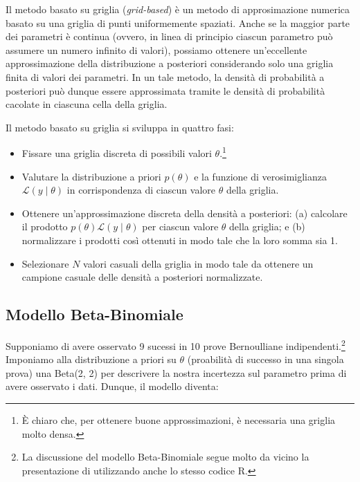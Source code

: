 \documentclass[
]{memoir}
\providecommand{\tightlist}{%
  \setlength{\itemsep}{0pt}\setlength{\parskip}{0pt}}
\newcommand{\R}{\textsf{R}} %
\begin{document}
Il metodo basato su griglia (\emph{grid-based}) è un metodo di approsimazione numerica basato su una griglia di punti uniformemente spaziati. Anche se la maggior parte dei parametri è continua (ovvero, in linea di principio ciascun parametro può assumere un numero infinito di valori), possiamo ottenere un'eccellente approssimazione della distribuzione a posteriori considerando solo una griglia finita di valori dei parametri. In un tale metodo, la densità di probabilità a posteriori può dunque essere approssimata tramite le densità di probabilità cacolate in ciascuna cella della griglia.

Il metodo basato su griglia si sviluppa in quattro fasi:

\begin{itemize}
\tightlist
\item
  Fissare una griglia discreta di possibili valori \(\theta\).\footnote{È chiaro che, per ottenere buone approssimazioni, è necessaria una griglia molto densa.}
\item
  Valutare la distribuzione a priori \(p(\theta)\) e la funzione di verosimiglianza \(\mathcal{L}(y \mid \theta)\) in corrispondenza di ciascun valore \(\theta\) della griglia.
\item
  Ottenere un'approssimazione discreta della densità a posteriori: (a) calcolare il prodotto \(p(\theta) \mathcal{L} (y \mid \theta)\) per ciascun
  valore \(\theta\) della griglia; e (b) normalizzare i prodotti così ottenuti in modo tale che la loro somma sia 1.
\item
  Selezionare \(N\) valori casuali della griglia in modo tale da ottenere un campione casuale delle densità a posteriori normalizzate.
\end{itemize}

\hypertarget{modello-beta-binomiale}{%
\subsection{Modello Beta-Binomiale}\label{modello-beta-binomiale}}

Supponiamo di avere osservato 9 sucessi in 10 prove Bernoulliane indipendenti.\footnote{La discussione del modello Beta-Binomiale segue molto da vicino la presentazione di \citet{Johnson2022bayesrules} utilizzando anche lo stesso codice \R.} Imponiamo alla distribuzione a priori su \(\theta\) (proabilità di successo in una singola prova) una Beta(2, 2) per descrivere la nostra incertezza sul parametro prima di avere osservato i dati. Dunque, il modello diventa:
\end{document}
